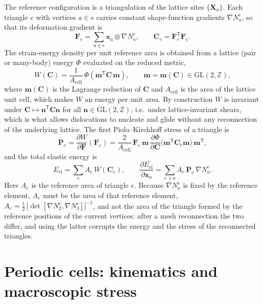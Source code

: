 \documentclass[11pt,a4paper]{article}
\newcommand{\F}{\mathbf F}
\newcommand{\C}{\mathbf C}
\newcommand{\Pk}{\mathbf P}
\newcommand{\x}{\mathbf x}
\newcommand{\X}{\mathbf X}
\newcommand{\m}{\mathbf m}
\begin{document}
The reference configuration is a triangulation of the lattice sites \(\{\X_a\}\). Each triangle
\(e\) with vertices \(a\in e\) carries constant shape-function gradients \(\nabla N_a^e\), so that
its deformation gradient is
\begin{equation}
  \F_e=\sum_{a\in e}\x_a\otimes\nabla N_a^e ,\qquad \C_e=\F_e^{\mathsf T}\F_e .
  \label{eq:Fe}
\end{equation}
The strain-energy density per unit reference area is obtained from a lattice (pair or many-body)
energy \(\Phi\) evaluated on the reduced metric,
\begin{equation}
  W(\C)=\frac{1}{A_{\mathrm{cell}}}\,\Phi\!\left(\m^{\mathsf T}\C\,\m\right),\qquad
  \m=\m(\C)\in\mathrm{GL}(2,\mathbb Z),
  \label{eq:W}
\end{equation}
where \(\m(\C)\) is the Lagrange reduction of \(\C\) and \(A_{\mathrm{cell}}\) is the area of the
lattice unit cell, which makes \(W\) an energy per unit area. By construction \(W\) is invariant
under \(\C\mapsto \mathbf n^{\mathsf T}\C\mathbf n\) for all \(\mathbf n\in\mathrm{GL}(2,\mathbb Z)\),
i.e.\ under lattice-invariant shears, which is what allows dislocations to nucleate and glide
without any reconnection of the underlying lattice. The first Piola--Kirchhoff stress of a
triangle is
\begin{equation}
  \Pk_e=\frac{\partial W}{\partial\F}(\F_e)
  =\frac{2}{A_{\mathrm{cell}}}\,\F_e\,\m\,
  \frac{\partial\Phi}{\partial\C}\big(\m^{\mathsf T}\C_e\m\big)\,\m^{\mathsf T},
  \label{eq:Pe}
\end{equation}
and the total elastic energy is
\begin{equation}
  E_{\mathrm{el}}=\sum_e A_e\,W(\C_e),\qquad
  \frac{\partial E_{\mathrm{el}}}{\partial\x_a}=\sum_{e\ni a}A_e\,\Pk_e\,\nabla N_a^e .
  \label{eq:E}
\end{equation}
Here \(A_e\) is the reference area of triangle \(e\). Because \(\nabla N^e_a\) is fixed by the
reference element, \(A_e\) must be the area of that reference element,
\(A_e=\tfrac12\,|\det[\nabla N^e_2,\nabla N^e_3]|^{-1}\), and not the area of the triangle formed
by the reference positions of the current vertices: after a mesh reconnection the two differ, and
using the latter corrupts the energy and the stress of the reconnected triangles.

\section{Periodic cells: kinematics and macroscopic stress}
\label{sec:pbc}
\end{document}
